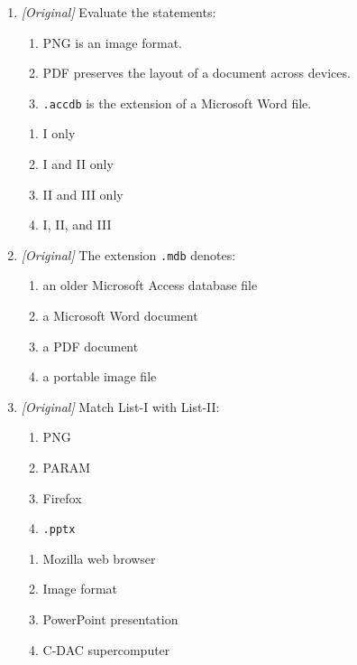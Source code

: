\documentclass[11pt]{article}
\begin{document}
\begin{enumerate}[label=\textbf{Q\arabic*.}, leftmargin=*]
  file format?
  \begin{enumerate}[label=\Alph*.]
    \item PNG
    \item JPEG
    \item GIF
    \item CSV
  \end{enumerate}
\item \textit{[Original]} Evaluate the statements:
  \begin{enumerate}[label=\Roman*.]
    \item PNG is an image format.
    \item PDF preserves the layout of a document across devices.
    \item \texttt{.accdb} is the extension of a Microsoft Word file.
  \end{enumerate}
  \begin{enumerate}[label=\Alph*.]
    \item I only
    \item I and II only
    \item II and III only
    \item I, II, and III
  \end{enumerate}
\item \textit{[Original]} The extension \texttt{.mdb} denotes:
  \begin{enumerate}[label=\Alph*.]
    \item an older Microsoft Access database file
    \item a Microsoft Word document
    \item a PDF document
    \item a portable image file
  \end{enumerate}
\item \textit{[Original]} Match List-I with List-II:
  \begin{enumerate}[label=(\roman*)]
    \item PNG
    \item PARAM
    \item Firefox
    \item \texttt{.pptx}
  \end{enumerate}
  \begin{enumerate}[label=(\alph*)]
    \item Mozilla web browser
    \item Image format
    \item PowerPoint presentation
    \item C-DAC supercomputer

\end{enumerate}
\end{enumerate}
\end{document}
